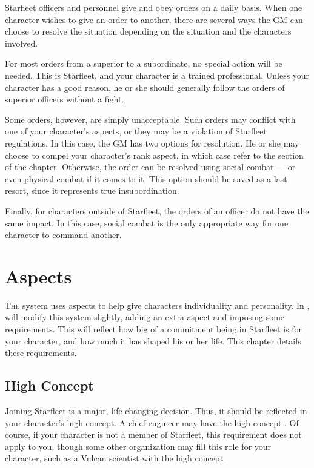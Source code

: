 \documentclass[12pt,titlepage,openany]{book}
\begin{document}
Starfleet officers and personnel give and obey orders on a daily basis. When
one character wishes to give an order to another, there are several ways the GM
can choose to resolve the situation depending on the situation and the
characters involved.

For most orders from a superior to a subordinate, no special action will be
needed. This is Starfleet, and your character is a trained professional.
Unless your character has a good reason, he or she should generally follow the
orders of superior officers without a fight.

Some orders, however, are simply unacceptable. Such orders may conflict with
one of your character's aspects, or they may be a violation of Starfleet
regulations. In this case, the GM has two options for resolution. He or she
may choose to compel your character's rank aspect, in which case refer to the
 section of the  chapter.
Otherwise, the order can be resolved using social combat --- or even physical
combat if it comes to it. This option should be saved as a last resort, since
it represents true insubordination.

Finally, for characters outside of Starfleet, the orders of an officer do not
have the same impact. In this case, social combat is the only appropriate way
for one character to command another.



\chapter{Aspects}\label{chap:aspects}

\lettrine[lines=1]{T}{he} \FateCore{} system uses aspects to help give
characters individuality and personality. In \StarTrekFate{}, will modify this
system slightly, adding an extra aspect and imposing some requirements. This
will reflect how big of a commitment being in Starfleet is for your character,
and how much it has shaped his or her life. This chapter details these
requirements.

\section{High Concept}\label{sec:high-concept}

Joining Starfleet is a major, life-changing decision. Thus, it should be
reflected in your character's high concept. A chief engineer may have the high
concept . Of course, if your character is not a
member of Starfleet, this requirement does not apply to you, though some other
organization may fill this role for your character, such as a Vulcan scientist
with the high concept .
\end{document}
